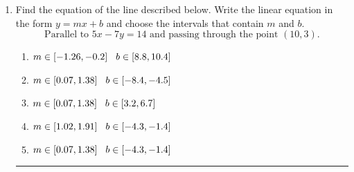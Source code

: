 \documentclass[14pt]{extbook}
\newcommand{\litem}[1]{\item#1\hspace*{-1cm}\rule{\textwidth}{0.4pt}}
\begin{document}
\begin{enumerate}
{\begin{enumerate}[label=\Alph*.]
\end{enumerate} }
\litem{
Find the equation of the line described below. Write the linear equation in the form $ y=mx+b $ and choose the intervals that contain $m$ and $b$.\[ \text{Parallel to } 5 x - 7 y = 14 \text{ and passing through the point } (10, 3). \]\begin{enumerate}[label=\Alph*.]
\item \( m \in [-1.26, -0.2] \hspace*{3mm} b \in [8.8, 10.4] \)
\item \( m \in [0.07, 1.38] \hspace*{3mm} b \in [-8.4, -4.5] \)
\item \( m \in [0.07, 1.38] \hspace*{3mm} b \in [3.2, 6.7] \)
\item \( m \in [1.02, 1.91] \hspace*{3mm} b \in [-4.3, -1.4] \)
\item \( m \in [0.07, 1.38] \hspace*{3mm} b \in [-4.3, -1.4] \)


\end{enumerate}}
\end{enumerate}
\end{document}
